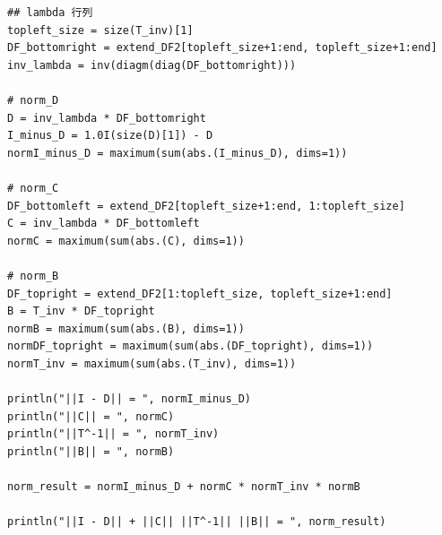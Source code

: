 \documentclass[11pt,a4paper,titlepage]{jsreport}
\theoremstyle{definition}
\begin{document}
\begin{lstlisting}[caption=calc_solve.jl, label=calc_solve,]
## lambda 行列
topleft_size = size(T_inv)[1]
DF_bottomright = extend_DF2[topleft_size+1:end, topleft_size+1:end]
inv_lambda = inv(diagm(diag(DF_bottomright)))

# norm_D
D = inv_lambda * DF_bottomright
I_minus_D = 1.0I(size(D)[1]) - D
normI_minus_D = maximum(sum(abs.(I_minus_D), dims=1))

# norm_C
DF_bottomleft = extend_DF2[topleft_size+1:end, 1:topleft_size]
C = inv_lambda * DF_bottomleft
normC = maximum(sum(abs.(C), dims=1))

# norm_B
DF_topright = extend_DF2[1:topleft_size, topleft_size+1:end]
B = T_inv * DF_topright
normB = maximum(sum(abs.(B), dims=1))
normDF_topright = maximum(sum(abs.(DF_topright), dims=1))
normT_inv = maximum(sum(abs.(T_inv), dims=1))

println("||I - D|| = ", normI_minus_D)
println("||C|| = ", normC)
println("||T^-1|| = ", normT_inv)
println("||B|| = ", normB)

norm_result = normI_minus_D + normC * normT_inv * normB

println("||I - D|| + ||C|| ||T^-1|| ||B|| = ", norm_result)
\end{lstlisting}
\end{document}
